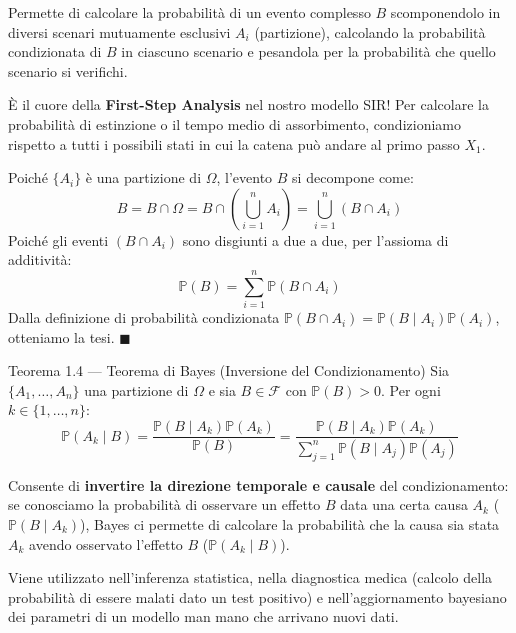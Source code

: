 \documentclass[11pt,a4paper]{report}
\newcommand{\PP}{\mathbb{P}}
\newcommand{\F}{\mathcal{F}}
\newcommand{\1}{\mathbf{1}}
\begin{document}
\begin{cosafa}
Permette di calcolare la probabilità di un evento complesso $B$ scomponendolo in diversi scenari mutuamente esclusivi $A_i$ (partizione), calcolando la probabilità condizionata di $B$ in ciascuno scenario e pesandola per la probabilità che quello scenario si verifichi.
\end{cosafa}

\begin{acosaserve}
È il cuore della \textbf{First-Step Analysis} nel nostro modello SIR! Per calcolare la probabilità di estinzione o il tempo medio di assorbimento, condizioniamo rispetto a tutti i possibili stati in cui la catena può andare al primo passo $X_1$.
\end{acosaserve}

\begin{dimostrazione}
Poiché $\{A_i\}$ è una partizione di $\Omega$, l'evento $B$ si decompone come:
\[ B = B \cap \Omega = B \cap \left(\bigcup_{i=1}^n A_i\right) = \bigcup_{i=1}^n (B \cap A_i) \]
Poiché gli eventi $(B \cap A_i)$ sono disgiunti a due a due, per l'assioma di additività:
\[ \PP(B) = \sum_{i=1}^n \PP(B \cap A_i) \]
Dalla definizione di probabilità condizionata $\PP(B \cap A_i) = \PP(B \mid A_i)\PP(A_i)$, otteniamo la tesi. $\blacksquare$
\end{dimostrazione}

\vspace{0.4cm}

\begin{teoremabox}{Teorema 1.4 --- Teorema di Bayes (Inversione del Condizionamento)}
Sia $\{A_1, \dots, A_n\}$ una partizione di $\Omega$ e sia $B \in \F$ con $\PP(B) > 0$. Per ogni $k \in \{1, \dots, n\}$:
\[ \PP(A_k \mid B) = \frac{\PP(B \mid A_k)\PP(A_k)}{\PP(B)} = \frac{\PP(B \mid A_k)\PP(A_k)}{\sum_{j=1}^n \PP(B \mid A_j)\PP(A_j)} \]
\end{teoremabox}

\begin{cosafa}
Consente di \textbf{invertire la direzione temporale e causale} del condizionamento: se conosciamo la probabilità di osservare un effetto $B$ data una certa causa $A_k$ ($\PP(B \mid A_k)$), Bayes ci permette di calcolare la probabilità che la causa sia stata $A_k$ avendo osservato l'effetto $B$ ($\PP(A_k \mid B)$).
\end{cosafa}

\begin{acosaserve}
Viene utilizzato nell'inferenza statistica, nella diagnostica medica (calcolo della probabilità di essere malati dato un test positivo) e nell'aggiornamento bayesiano dei parametri di un modello man mano che arrivano nuovi dati.
\end{acosaserve}
\end{document}

